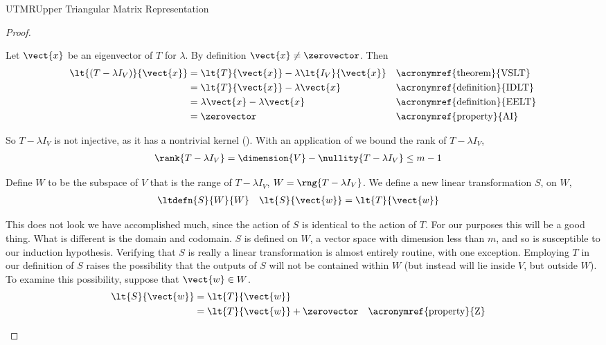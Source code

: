 \begin{subsect}{UTMR}{Upper Triangular Matrix Representation}
\begin{proof}
%
\begin{para}Let $\vect{x}$ be an eigenvector of $T$ for $\lambda$.  By definition $\vect{x}\neq\zerovector$.  Then
%
\begin{align*}
\lt{\left(T-\lambda I_V\right)}{\vect{x}}
&=\lt{T}{\vect{x}}-\lambda\lt{I_V}{\vect{x}}
&&\text{\acronymref{theorem}{VSLT}}\\
%
&=\lt{T}{\vect{x}}-\lambda\vect{x}
&&\text{\acronymref{definition}{IDLT}}\\
%
&=\lambda\vect{x}-\lambda\vect{x}
&&\text{\acronymref{definition}{EELT}}\\
%
&=\zerovector
&&\text{\acronymref{property}{AI}}
%
\end{align*}
\end{para}
%
\begin{para}So $T-\lambda I_V$ is not injective, as it has a nontrivial kernel ().  With an application of  we bound the rank of $T-\lambda I_V$,
%
\begin{align*}
\rank{T-\lambda I_V}&=\dimension{V}-\nullity{T-\lambda I_V}\leq m-1
\end{align*}
\end{para}
%
\begin{para}Define $W$ to be the subspace of $V$ that is the range of $T-\lambda I_V$, $W=\rng{T-\lambda I_V}$.   We define a new linear transformation $S$, on $W$,
%
\begin{align*}
&\ltdefn{S}{W}{W}
&
\lt{S}{\vect{w}}&=\lt{T}{\vect{w}}
\end{align*}
\end{para}
%
\begin{para}This does not look we have accomplished much, since the action of $S$ is identical to the action of $T$.  For our purposes this will be a good thing.  What is different is the domain and codomain.  $S$ is defined on $W$, a vector space with dimension less than $m$, and so is susceptible to our induction hypothesis.  Verifying that $S$ is really a linear transformation is almost entirely routine, with one exception.  Employing $T$ in our definition of $S$ raises the possibility that the outputs of $S$ will not be contained within $W$ (but instead will lie inside $V$, but outside $W$).  To examine this possibility, suppose that $\vect{w}\in W$.
%
\begin{align*}
\lt{S}{\vect{w}}
&=\lt{T}{\vect{w}}\\
&=\lt{T}{\vect{w}}+\zerovector&&\text{\acronymref{property}{Z}}\\

\end{align*}
\end{para}
\end{proof}
\end{subsect}
